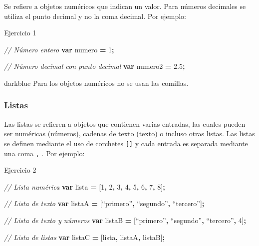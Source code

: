 \documentclass[
  12pt,
  letterpaper,
  twoside]{book}
\newenvironment{Shaded}{\begin{snugshade}}{\end{snugshade}}
\newcommand{\CommentTok}[1]{\textcolor[rgb]{0.56,0.35,0.01}{\textit{#1}}}
\newcommand{\DecValTok}[1]{\textcolor[rgb]{0.00,0.00,0.81}{#1}}
\newcommand{\FloatTok}[1]{\textcolor[rgb]{0.00,0.00,0.81}{#1}}
\newcommand{\KeywordTok}[1]{\textcolor[rgb]{0.13,0.29,0.53}{\textbf{#1}}}
\newcommand{\NormalTok}[1]{#1}
\newcommand{\OperatorTok}[1]{\textcolor[rgb]{0.81,0.36,0.00}{\textbf{#1}}}
\begin{document}
Se refiere a objetos numéricos que indican un valor. Para números decimales se utiliza el punto decimal y no la coma decimal. Por ejemplo:

Ejercicio 1

\begin{Shaded}
\begin{Highlighting}[]
\CommentTok{// Número entero}
\KeywordTok{var}\NormalTok{ numero }\OperatorTok{=} \DecValTok{1}\OperatorTok{;} 
 
\CommentTok{// Número decimal con punto decimal  }
\KeywordTok{var}\NormalTok{ numero2 }\OperatorTok{=} \FloatTok{2.5}\OperatorTok{;}  
\end{Highlighting}
\end{Shaded}

\begin{bluebox2}

\begin{awesomeblock}{5pt}{\faLightbulb}{darkblue}
Para los objetos numéricos no se usan las comillas.

\end{awesomeblock}

\end{bluebox2}

\hypertarget{listas}{%
\subsubsection*{Listas}\label{listas}}

Las listas se refieren a objetos que contienen varias entradas, las cuales pueden ser numéricas (números), cadenas de texto (texto) o incluso otras listas. Las listas se definen mediante el uso de corchetes \texttt{{[}{]}} y cada entrada es separada mediante una coma \texttt{,} . Por ejemplo:

Ejercicio 2

\begin{Shaded}
\begin{Highlighting}[]
\CommentTok{// Lista numérica}
\KeywordTok{var}\NormalTok{ lista }\OperatorTok{=}\NormalTok{ [}\DecValTok{1}\OperatorTok{,} \DecValTok{2}\OperatorTok{,} \DecValTok{3}\OperatorTok{,} \DecValTok{4}\OperatorTok{,} \DecValTok{5}\OperatorTok{,} \DecValTok{6}\OperatorTok{,} \DecValTok{7}\OperatorTok{,} \DecValTok{8}\NormalTok{]}\OperatorTok{;}   
  
\CommentTok{// Lista de texto            }
\KeywordTok{var}\NormalTok{ listaA }\OperatorTok{=}\NormalTok{ [“primero”}\OperatorTok{,}\NormalTok{ “segundo”}\OperatorTok{,}\NormalTok{ “tercero”]}\OperatorTok{;} 
   
\CommentTok{// Lista de texto y números  }
\KeywordTok{var}\NormalTok{ listaB }\OperatorTok{=}\NormalTok{ [“primero”}\OperatorTok{,}\NormalTok{ “segundo”}\OperatorTok{,}\NormalTok{ “tercero”}\OperatorTok{,} \DecValTok{4}\NormalTok{]}\OperatorTok{;} 

\CommentTok{// Lista de listas  }
\KeywordTok{var}\NormalTok{ listaC }\OperatorTok{=}\NormalTok{ [lista}\OperatorTok{,}\NormalTok{ listaA}\OperatorTok{,}\NormalTok{ listaB]}\OperatorTok{;} 
\end{Highlighting}
\end{Shaded}
\end{document}
